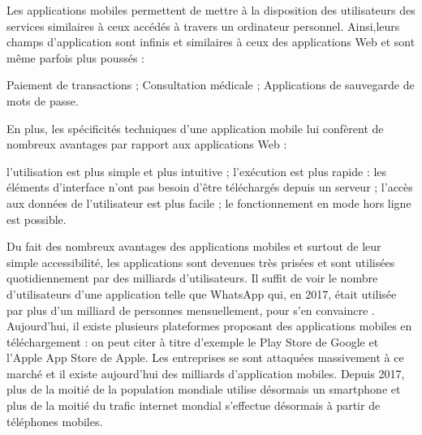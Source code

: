 \begin{comment}
Il existe principalement trois types d'applications mobiles :\\
- Native : applications mobiles spécifiques systèmes d'exploitation mobile Ios, Android ou Windows Phone;\\
- Hybride : applications mobiles disponibles à la fois pour toutes les plateformes;\\
- Web : Version responsive\footnote{Le Responsive Web Design (RWD), ou conception web adaptative, regroupe une série de techniques de conception graphique et de développement permettant de créer un site qui pourra s'auto-adapter en fonction de la taille d'un écran.} utilisant des navigateurs web embarqués.\\
\end{comment}
Les applications mobiles permettent de mettre à la disposition des utilisateurs des services similaires à ceux accédés à travers un ordinateur personnel. Ainsi,leurs champs d'application sont infinis et similaires à ceux des applications Web et sont même parfois plus poussés :
\begin{itemize}
	\itemtirait Paiement de transactions ;
	\itemtirait Consultation médicale ;
	\itemtirait Applications de sauvegarde de mots de passe.
\end{itemize}
En plus, les spécificités techniques d’une application mobile lui confèrent de nombreux avantages par rapport aux applications Web :
\begin{itemize}
	\itemcheck l'utilisation est plus simple et plus intuitive ;
	\itemcheck l’exécution est plus rapide : les éléments d’interface n’ont pas besoin d’être téléchargés depuis un serveur ;
	\itemcheck l’accès aux données de l’utilisateur est plus facile ; 
	\itemcheck le fonctionnement en mode hors ligne est possible.
\end{itemize}
Du fait des nombreux avantages des applications mobiles et surtout de leur simple accessibilité, les applications sont devenues très prisées et sont utilisées quotidiennement par des milliards d'utilisateurs. Il suffit de voir le nombre d'utilisateurs d'une application telle que WhatsApp qui, en 2017, était utilisée par plus d'un milliard de personnes mensuellement, pour s'en convaincre \cite{whatsapp-usage}. Aujourd'hui, il existe plusieurs plateformes proposant des applications mobiles en téléchargement : on peut citer à titre d'exemple le Play Store de Google et l'Apple App Store de Apple. Les entreprises se sont attaquées massivement à ce marché et il existe aujourd'hui des milliards d'application mobiles. Depuis 2017, plus de la moitié de la population mondiale utilise désormais un smartphone et plus de la moitié du trafic internet mondial s’effectue désormais à partir de téléphones mobiles.\cite{consumer-barometer}\\
